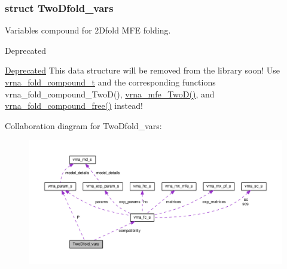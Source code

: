 \subsubsection{struct Two\+Dfold\+\_\+vars}
Variables compound for 2\+Dfold M\+F\+E folding. 

\begin{DoxyRefDesc}{Deprecated}
\item[\hyperlink{deprecated__deprecated000001}{Deprecated}]This data structure will be removed from the library soon! Use \hyperlink{group__fold__compound_ga1b0cef17fd40466cef5968eaeeff6166}{vrna\+\_\+fold\+\_\+compound\+\_\+t} and the corresponding functions vrna\+\_\+fold\+\_\+compound\+\_\+\+Two\+D(), \hyperlink{group__kl__neighborhood__mfe_ga243c288b463147352829df04de6a2f77}{vrna\+\_\+mfe\+\_\+\+Two\+D()}, and \hyperlink{group__fold__compound_gadded6039d63f5d6509836e20321534ad}{vrna\+\_\+fold\+\_\+compound\+\_\+free()} instead! \end{DoxyRefDesc}


Collaboration diagram for Two\+Dfold\+\_\+vars\+:
\nopagebreak
\begin{figure}[H]
\begin{center}
\leavevmode
\includegraphics[width=350pt]{structTwoDfold__vars__coll__graph}
\end{center}
\end{figure}
